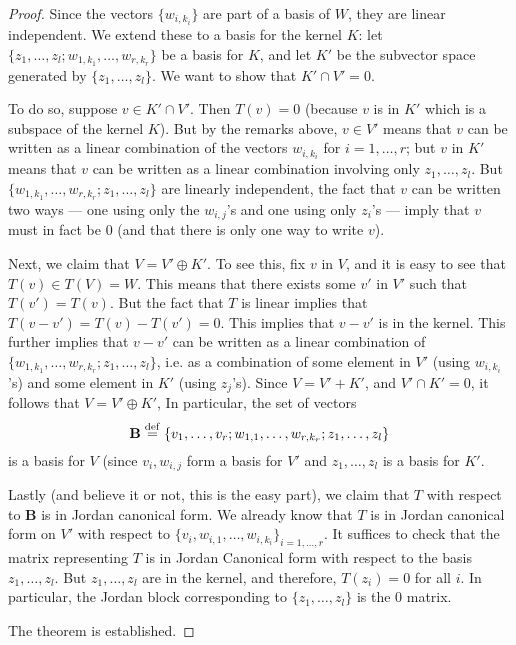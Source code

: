 \begin{proof}
Since the vectors $\{w_{i,{k_i}}\}$ are part of a basis of $W$, they are linear
independent. We extend these to a basis for the kernel $K$: let $\{z_1,\dots,z_l;
w_{1,k_1}, \dots,w_{r,k_r}\}$ be a basis for $K$, and let $K'$ be
the subvector space generated by $\{z_1,\dots,z_l\}$. We want to show
that $K' \cap V' = 0$.

To do so, suppose $v \in K' \cap V'$. Then $T(v) = 0$ (because $v$ is
in $K'$ which is a subspace of the kernel $K$). But by the remarks
above, $v \in V'$ means that $v$ can be written as a linear combination of the vectors
$w_{i,k_i}$ for $i = 1,\dots,r$; but $v$ in $K'$ means that $v$ can be
written as a linear combination involving only $z_1,\dots,z_l$. But $\{w_{1,k_1},\dots, 
w_{r,k_r}; z_1,\dots,z_l\}$ are linearly independent, the fact that $v$ can
be written two ways --- one using only the $w_{i,j}$'s and one using only
$z_i$'s --- imply that $v$ must in fact be $0$ (and that there is only one
way to write $v$).

Next, we claim that $V = V' \oplus K'$. To see this, fix $v$ in $V$,
and it is easy to see that $T(v) \in T(V) = W$. This means that there exists
some $v'$ in $V'$ such that $T(v') = T(v)$. But the fact that $T$ is linear
implies that $T(v - v') = T(v) - T(v') = 0$. This implies that $v - v'$ is
in the kernel. This further implies that $v - v'$ can be written as a linear
combination of $\{w_{1,k_1},\dots,w_{r,k_r};z_1,\dots,z_l\}$, i.e. as a 
combination of some element in $V'$ (using $w_{i,k_i}$'s) and some element in
$K'$ (using $z_j$'s). Since $V = V' + K'$, and $V' \cap K' = 0$, it follows that $V = V' \oplus K'$,
In particular, the set of vectors
\[
\mathbf{B} \stackrel{\mathrm{def}}{=} \{v_1,\dots,v_r;w_{1,1},\dots,w_{r,k_r}; z_1,\dots,z_l\}
\]
is a basis for $V$ (since $v_i,w_{i,j}$ form a basis for $V'$ and $z_1,\dots,z_l$
is a basis for $K'$.

Lastly (and believe it or not, this is the easy part), we claim that $T$
with respect to $\mathbf{B}$ is in Jordan canonical form. We already know
that $T$ is in Jordan canonical form on $V'$ with respect to 
$\{v_i, w_{i,1},\dots,w_{i,{k_i}}\}_{i = 1,\dots,r}$. It suffices to
check that the matrix representing $T$ is in Jordan Canonical form with
respect to the basis $z_1,\dots,z_l$. But $z_1,\dots,z_l$ are in the kernel,
and therefore, $T(z_i) = 0$ for all $i$. In particular, the Jordan block
corresponding to $\{z_1,\dots,z_l\}$ is the $0$ matrix.

The theorem is established.
\end{proof}


